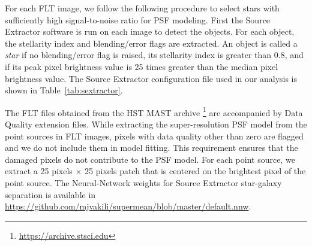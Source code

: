 \documentclass[onecolumn]{aastex61}
\begin{document}
For each FLT image, we follow the following procedure to select stars with sufficiently high signal-to-noise ratio 
for PSF modeling. First the Source Extractor software \citep{sextractor} is run on each image to detect the objects. 
For each object, the stellarity index and blending/error flags are extracted. An object is called a \emph{star} if no blending/error flag is 
raised, its stellarity index is greater than 0.8, and if its peak pixel brightness value is 25 times greater than the median pixel brightness 
value. The Source Extractor configuration file used in our analysis is shown in Table~\ref{tab:sextractor}. 

The FLT files obtained from the HST MAST archive \footnote{\url{https://archive.stsci.edu}} are accompanied by Data Quality extension files. 
While extracting the super-resolution PSF model from the point sources in FLT images, pixels with data quality other than zero are flagged and we do not include them in model fitting. This requirement ensures that the damaged pixels do not contribute to the PSF model. For each point source, we extract a 25 pixels $\times$ 25 pixels patch that is centered on the brightest pixel of the point source. The Neural-Network weights for Source Extractor star-galaxy separation is available in \url{https://github.com/mjvakili/supermean/blob/master/default.nnw}.

\end{document}
